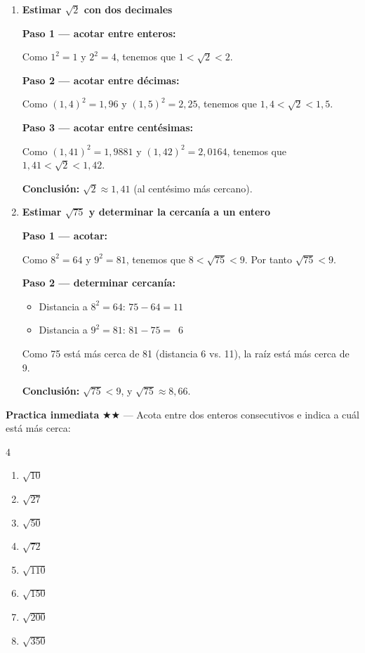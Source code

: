 \documentclass[11pt, letterpaper]{article}
\begin{document}
\begin{tcolorbox}[examplebox, title={Ejemplos — estimación por aproximación sucesiva}]
\begin{enumerate}[label=\textbf{Ej. \arabic*.}, leftmargin=*, itemsep=16pt]

\item \textbf{Estimar $\sqrt{2}$ con dos decimales}

\textbf{Paso 1 — acotar entre enteros:}

Como $1^2=1$ y $2^2=4$, tenemos que $1 < \sqrt{2} < 2$.

\textbf{Paso 2 — acotar entre décimas:}

Como $(1{,}4)^2=1{,}96$ y $(1{,}5)^2=2{,}25$, tenemos que $1{,}4 < \sqrt{2} < 1{,}5$.

\textbf{Paso 3 — acotar entre centésimas:}

Como $(1{,}41)^2=1{,}9881$ y $(1{,}42)^2=2{,}0164$, tenemos que $1{,}41 < \sqrt{2} < 1{,}42$.

\textbf{Conclusión:} $\sqrt{2} \approx 1{,}41$ (al centésimo más cercano).

\item \textbf{Estimar $\sqrt{75}$ y determinar la cercanía a un entero}

\textbf{Paso 1 — acotar:}

Como $8^2=64$ y $9^2=81$, tenemos que $8 < \sqrt{75} < 9$. Por tanto $\sqrt{75} < 9$.

\textbf{Paso 2 — determinar cercanía:}
\begin{itemize}[itemsep=2pt]
  \item Distancia a $8^2=64$: $75-64=11$
  \item Distancia a $9^2=81$: $81-75=\phantom{1}6$
\end{itemize}

Como 75 está más cerca de 81 (distancia 6 vs. 11), la raíz está más cerca de 9.

\textbf{Conclusión:} $\sqrt{75} < 9$, y $\sqrt{75} \approx 8{,}66$.

\end{enumerate}
\end{tcolorbox}

\medskip
\textbf{Practica inmediata} \quad $\bigstar\bigstar$ — Acota entre dos enteros consecutivos e indica a cuál está más cerca:
\begin{multicols}{4}
\begin{enumerate}[label=\alph*), leftmargin=*]
  \item $\sqrt{10}$
  \item $\sqrt{27}$
  \item $\sqrt{50}$
  \item $\sqrt{72}$
  \item $\sqrt{110}$
  \item $\sqrt{150}$
  \item $\sqrt{200}$
  \item $\sqrt{350}$
\end{enumerate}
\end{multicols}
\end{document}
